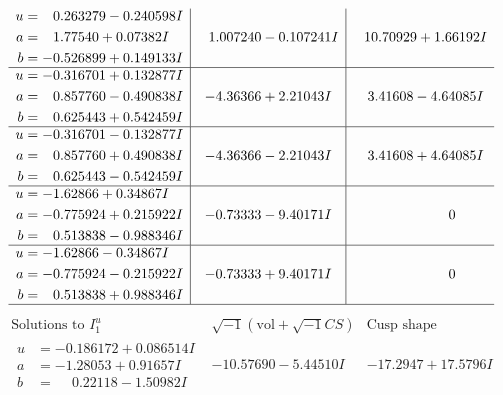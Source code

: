 \documentclass[1p]{elsarticle_modified}
\theoremstyle{definition}
\newcommand{\I}{\sqrt{-1}}
\begin{document}
$$\begin{array}{c|c|c}
\begin{aligned}
u &= \phantom{-}0.263279 - 0.240598 I \\
a &= \phantom{-}1.77540 + 0.07382 I \\
b &= -0.526899 + 0.149133 I\end{aligned}
 & \phantom{-}1.007240 - 0.107241 I & \phantom{-}10.70929 + 1.66192 I \\ \hline\begin{aligned}
u &= -0.316701 + 0.132877 I \\
a &= \phantom{-}0.857760 - 0.490838 I \\
b &= \phantom{-}0.625443 + 0.542459 I\end{aligned}
 & -4.36366 + 2.21043 I & \phantom{-}3.41608 - 4.64085 I \\ \hline\begin{aligned}
u &= -0.316701 - 0.132877 I \\
a &= \phantom{-}0.857760 + 0.490838 I \\
b &= \phantom{-}0.625443 - 0.542459 I\end{aligned}
 & -4.36366 - 2.21043 I & \phantom{-}3.41608 + 4.64085 I \\ \hline\begin{aligned}
u &= -1.62866 + 0.34867 I \\
a &= -0.775924 + 0.215922 I \\
b &= \phantom{-}0.513838 - 0.988346 I\end{aligned}
 & -0.73333 - 9.40171 I & \phantom{-0.000000 } 0 \\ \hline\begin{aligned}
u &= -1.62866 - 0.34867 I \\
a &= -0.775924 - 0.215922 I \\
b &= \phantom{-}0.513838 + 0.988346 I\end{aligned}
 & -0.73333 + 9.40171 I & \phantom{-0.000000 } 0\\
 \hline 
 \end{array}$$\newpage$$\begin{array}{c|c|c}  
\text{Solutions to }I^u_{1}& \I (\text{vol} + \sqrt{-1}CS) & \text{Cusp shape}\\
 \hline 
\begin{aligned}
u &= -0.186172 + 0.086514 I \\
a &= -1.28053 + 0.91657 I \\
b &= \phantom{-}0.22118 - 1.50982 I\end{aligned}
 & -10.57690 - 5.44510 I & -17.2947 + 17.5796 I \\ \hline\begin{aligned}

\end{aligned}
\end{array}$$
\end{document}
